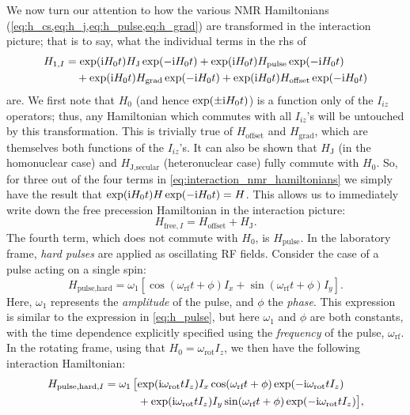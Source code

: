 We now turn our attention to how the various NMR Hamiltonians (\cref{eq:h_cs,eq:h_j,eq:h_pulse,eq:h_grad}) are transformed in the interaction picture; that is to say, what the individual terms in the rhs of
\begin{equation}
    \label{eq:interaction_nmr_hamiltonians}
    \begin{aligned}
        H_{1,I} &= \exp(\mathrm{i} H_0 t) H_\text{J} \exp(-\mathrm{i} H_0 t) + \exp(\mathrm{i} H_0 t) H_\text{pulse} \exp(-\mathrm{i} H_0 t) \\
                &\quad + \exp(\mathrm{i} H_0 t) H_\text{grad} \exp(-\mathrm{i} H_0 t) + \exp(\mathrm{i} H_0 t) H_\text{offset} \exp(-\mathrm{i} H_0 t)
    \end{aligned}
\end{equation}
are.
We first note that $H_0$ (and hence $\exp(\pm \mathrm{i} H_0t)$) is a function only of the $I_{iz}$ operators; thus, any Hamiltonian which commutes with all $I_{iz}$'s will be untouched by this transformation.
This is trivially true of $H_\text{offset}$ and $H_\text{grad}$, which are themselves both functions of the $I_{iz}$'s.
It can also be shown that $H_\text{J}$ (in the homonuclear case) and $H_\text{J,secular}$ (heteronuclear case) fully commute with $H_0$.
So, for three out of the four terms in \cref{eq:interaction_nmr_hamiltonians} we simply have the result that $\exp(\mathrm{i} H_0t)H\exp(-\mathrm{i} H_0t) = H$.
This allows us to immediately write down the free precession Hamiltonian in the interaction picture:
\begin{equation}
    \label{eq:h_free_interaction}
    H_{\text{free},I} = H_\text{offset} + H_\text{J}.
\end{equation}
The fourth term, which does not commute with $H_0$, is $H_\text{pulse}$.
In the laboratory frame, \textit{hard pulses} are applied as oscillating RF fields.
Consider the case of a pulse acting on a single spin:
\begin{equation}
    \label{eq:hard_pulse}
    H_\text{pulse,hard} = \omega_1 [\cos(\omega_\text{rf}t + \phi) I_x + \sin(\omega_\text{rf}t + \phi) I_y].
\end{equation}
Here, $\omega_1$ represents the \textit{amplitude} of the pulse, and $\phi$ the \textit{phase}. This expression is similar to the expression in \cref{eq:h_pulse}, but here $\omega_1$ and $\phi$ are both constants, with the time dependence explicitly specified using the \textit{frequency} of the pulse, $\omega_\text{rf}$.
In the rotating frame, using that $H_0 = \omega_\text{rot}I_z$, we then have the following interaction Hamiltonian:
\begin{equation}
    \label{eq:hard_pulse_rotatingframe_intermediate}
    \begin{aligned}
        H_{\text{pulse,hard,}I} &= \omega_1 \,\big[\! \exp(\mathrm{i} \omega_\text{rot}t I_z) I_x \cos(\omega_\text{rf}t + \phi) \exp(-\mathrm{i} \omega_\text{rot}t I_z) \\
                                &\quad\quad\quad + \exp(\mathrm{i} \omega_\text{rot}t I_z) I_y \sin(\omega_\text{rf}t + \phi) \exp(-\mathrm{i} \omega_\text{rot}t I_z) \big],
    \end{aligned}
\end{equation}

